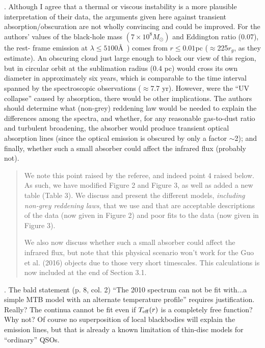 \documentclass[11pt, a4paper]{article}
\begin{document}
. Although I agree that a thermal or viscous instability is a more
plausible interpretation of their data, the arguments given here
against transient absorption/obscuration are not wholly convincing and
could be improved. For the authors’ values of the black-hole mass
$(7\times10^{8} M_{\odot})$ and Eddington ratio (0.07), the rest-
frame emission at $\lambda \leq 5100$\AA\ ) comes from $r \leq 0.01$pc
($\approx$225$r_{g}$, as they estimate). An obscuring cloud just large
enough to block our view of this region, but in circular orbit at the
sublimation radius (0.4 pc) would cross its own diameter in
approximately six years, which is comparable to the time interval
spanned by the spectroscopic observations ($\approx$7.7 yr). However,
were the ``UV collapse'' caused by absorption, there would be other
implications. The authors should determine what (non-grey) reddening
law would be needed to explain the differences among the spectra, and
whether, for any reasonable gas-to-dust ratio and turbulent
broadening, the absorber would produce transient optical absorption
lines (since the optical emission is obscured by only a factor
$\sim$2); and finally, whether such a small absorber could affect the
infrared flux (probably not).

\begin{quote}
We note this point raised by the referee, and indeed point 4 raised
below. As such, we have modified Figure 2 and Figure 3, as well as
added a new table (Table 3). We discuss and present the different
models, {\it including non-grey reddening laws}, that we use and that
are acceptable descriptions of the data (now given in Figure 2) and poor
fits to the data (now given in Figure 3).  

We also now discuss whether
such a small absorber could affect the infrared flux, but note that
this physical scenario won't work for the Guo et al. (2016) objects
due to those very short timescales. This calculations is now included
at the end of Section 3.1.
\end{quote}


. The bald statement (p. 8, col. 2) ``The 2010 spectrum can not be fit
with...a simple MTB model with an alternate temperature profile''
requires justification. Really? The continua cannot be fit even if
$T_{\rm eff}(r)$ is a completely free function? Why not? Of course no
superposition of local blackbodies will explain the emission lines,
but that is already a known limitation of thin-disc models for
``ordinary'' QSOs.
\end{document}
